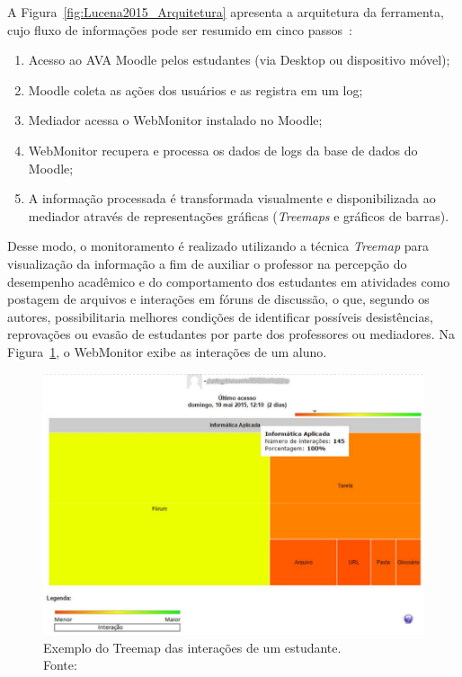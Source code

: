 A Figura~\ref{fig:Lucena2015_Arquitetura} apresenta a arquitetura da ferramenta, cujo fluxo de informações pode ser resumido em cinco passos~\citep{Lucena:2015}: 
\begin{enumerate}
    \item Acesso ao AVA Moodle pelos estudantes (via Desktop ou dispositivo móvel);
    \item Moodle coleta as ações dos usuários e as registra em um log;
    \item Mediador acessa o WebMonitor instalado no Moodle;
    \item WebMonitor recupera e processa os dados de logs da base de dados do Moodle;
    \item A informação processada é transformada visualmente e disponibilizada ao mediador através de representações gráficas (\textit{Treemaps} e gráficos de barras).
\end{enumerate}

Desse modo, o monitoramento é realizado utilizando a técnica \textit{Treemap} para visualização da informação a fim de auxiliar o professor na percepção do desempenho acadêmico e do comportamento dos estudantes em atividades como postagem de arquivos e interações em fóruns de discussão, o que, segundo os autores, possibilitaria melhores condições de identificar possíveis desistências, reprovações ou evasão de
estudantes por parte dos professores ou mediadores. Na Figura~\ref{fig:Lucena2015}, o WebMonitor exibe as interações de um aluno.

\begin{figure}[htb]
	\centering
	\includegraphics[width=0.9\linewidth]{chapters/works/Lucena2015.png}
	\captionsetup{justification=centering}
	\caption{Exemplo do Treemap das interações de um estudante. \\Fonte:\cite{Lucena:2015}}
	\label{fig:Lucena2015}
\end{figure}

